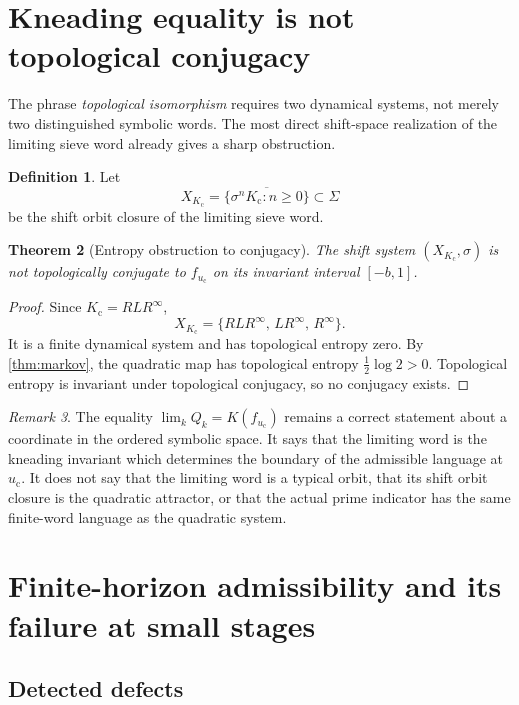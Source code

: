 \documentclass[11pt]{article}
\newtheorem{theorem}{Theorem}[section]
\theoremstyle{definition}
\newtheorem{definition}[theorem]{Definition}
\theoremstyle{remark}
\newtheorem{remark}[theorem]{Remark}
\newcommand{\Sig}{\Sigma}
\newcommand{\sh}{\sigma}
\newcommand{\uc}{u_{\mathrm c}}
\newcommand{\Kc}{K_{\mathrm c}}
\begin{document}
\section{Kneading equality is not topological conjugacy}

The phrase \emph{topological isomorphism} requires two dynamical systems, not merely two distinguished symbolic words.  The most direct shift-space realization of the limiting sieve word already gives a sharp obstruction.

\begin{definition}
Let
\[
    X_{\Kc}=\overline{\{\sh^n\Kc:n\ge0\}}\subset\Sig
\]
be the shift orbit closure of the limiting sieve word.
\end{definition}

\begin{theorem}[Entropy obstruction to conjugacy]\label{thm:no-conjugacy}
The shift system $(X_{\Kc},\sh)$ is not topologically conjugate to $f_{\uc}$ on its invariant interval $[-b,1]$.
\end{theorem}

\begin{proof}
Since $\Kc=RLR^\infty$,
\[
    X_{\Kc}=\{RLR^\infty,\,LR^\infty,\,R^\infty\}.
\]
It is a finite dynamical system and has topological entropy zero.  By \cref{thm:markov}, the quadratic map has topological entropy $\frac12\log2>0$.  Topological entropy is invariant under topological conjugacy, so no conjugacy exists.
\end{proof}

\begin{remark}
The equality $\lim_k Q_k=K(f_{\uc})$ remains a correct statement about a coordinate in the ordered symbolic space.  It says that the limiting word is the kneading invariant which determines the boundary of the admissible language at $\uc$.  It does not say that the limiting word is a typical orbit, that its shift orbit closure is the quadratic attractor, or that the actual prime indicator has the same finite-word language as the quadratic system.
\end{remark}

\section{Finite-horizon admissibility and its failure at small stages}

\subsection{Detected defects}
\end{document}
